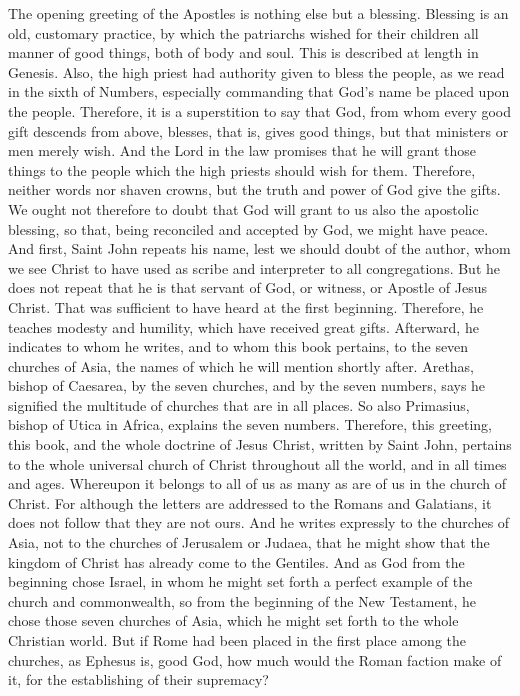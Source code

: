 The opening greeting of the Apostles is nothing else but a blessing. Blessing is an old, customary practice, by which the patriarchs wished for their children all manner of good things, both of body and soul. This is described at length in Genesis. Also, the high priest had authority given to bless the people, as we read in the sixth of Numbers, especially commanding that God’s name be placed upon the people. Therefore, it is a superstition to say that God, from whom every good gift descends from above, blesses, that is, gives good things, but that ministers or men merely wish. And the Lord in the law promises that he will grant those things to the people which the high priests should wish for them. Therefore, neither words nor shaven crowns, but the truth and power of God give the gifts. We ought not therefore to doubt that God will grant to us also the apostolic blessing, so that, being reconciled and accepted by God, we might have peace. And first, Saint John repeats his name, lest we should doubt of the author, whom we see Christ to have used as scribe and interpreter to all congregations. But he does not repeat that he is that servant of God, or witness, or Apostle of Jesus Christ. That was sufficient to have heard at the first beginning. Therefore, he teaches modesty and humility, which have received great gifts. Afterward, he indicates to whom he writes, and to whom this book pertains, to the seven churches of Asia, the names of which he will mention shortly after. Arethas, bishop of Caesarea, by the seven churches, and by the seven numbers, says he signified the multitude of churches that are in all places. So also Primasius, bishop of Utica in Africa, explains the seven numbers. Therefore, this greeting, this book, and the whole doctrine of Jesus Christ, written by Saint John, pertains to the whole universal church of Christ throughout all the world, and in all times and ages. Whereupon it belongs to all of us as many as are of us in the church of Christ. For although the letters are addressed to the Romans and Galatians, it does not follow that they are not ours. And he writes expressly to the churches of Asia, not to the churches of Jerusalem or Judaea, that he might show that the kingdom of Christ has already come to the Gentiles. And as God from the beginning chose Israel, in whom he might set forth a perfect example of the church and commonwealth, so from the beginning of the New Testament, he chose those seven churches of Asia, which he might set forth to the whole Christian world. But if Rome had been placed in the first place among the churches, as Ephesus is, good God, how much would the Roman faction make of it, for the establishing of their supremacy?

